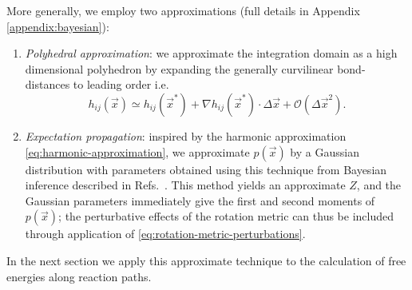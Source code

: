 \documentclass[11pt,twoside]{report}
\begin{document}
More generally, we employ two approximations (full details in Appendix \ref{appendix:bayesian}):
\begin{enumerate}
\item \emph{Polyhedral approximation}: we approximate the integration domain as a high dimensional polyhedron by expanding the generally curvilinear bond-distances to leading order i.e.\
  \begin{equation*}
    h_{ij}(\vec{x})
    \simeq
    h_{ij}(\vec{x}^*)
    + \nabla h_{ij}(\vec{x}^*) \cdot \Delta \vec{x}
    + \mathcal{O}(\Delta \vec{x}^2).
  \end{equation*}
\item \emph{Expectation propagation}: inspired by the harmonic approximation \eqref{eq:harmonic-approximation}, we approximate $p(\vec{x})$ by a Gaussian distribution with parameters obtained using this technique from Bayesian inference described in Refs.\ \cite{Minka2001,MinkaUAI2001,Rasmussen2006,Cunningham2011}.
  This method yields an approximate $Z$, and the Gaussian parameters immediately give the first and second moments of $p(\vec{x})$; the perturbative effects of the rotation metric can thus be included through application of \eqref{eq:rotation-metric-perturbations}.
\end{enumerate}
In the next section we apply this approximate technique to the calculation of free energies along reaction paths.

\end{document}
